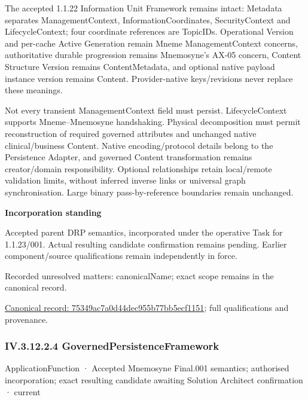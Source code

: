 The accepted 1.1.22 Information Unit Framework remains intact: Metadata separates ManagementContext, InformationCoordinates, SecurityContext and LifecycleContext; four coordinate references are TopicIDs. Operational Version and per-cache Active Generation remain Mneme ManagementContext concerns, authoritative durable progression remains Mnemosyne's AX-05 concern, Content Structure Version remains ContentMetadata, and optional native payload instance version remains Content. Provider-native keys/revisions never replace these meanings.



Not every transient ManagementContext field must persist. LifecycleContext supports Mneme–Mnemosyne handshaking. Physical decomposition must permit reconstruction of required governed attributes and unchanged native clinical/business Content. Native encoding/protocol details belong to the Persistence Adapter, and governed Content transformation remains creator/domain responsibility. Optional relationships retain local/remote validation limits, without inferred inverse links or universal graph synchronisation. Large binary pass-by-reference boundaries remain unchanged.



\par\medskip\textbf{Incorporation standing}\par


Accepted parent DRP semantics, incorporated under the operative Task for 1.1.23/001. Actual resulting candidate confirmation remains pending. Earlier component/source qualifications remain independently in force.


{\small Recorded unresolved matters: canonicalName; exact scope remains in the canonical record.}\par
{\footnotesize \href{../../../../continuum/application/application-function/75349ac7a0d44dec955b77bb5ecf1151.md}{Canonical record: 75349ac7a0d44dec955b77bb5ecf1151}; full qualifications and provenance.}\par
\subsubsection*{IV.3.12.2.4 GovernedPersistenceFramework}
\label{navigation:IV.3.12.2.4}

\label{element:812fa47cef1442aeb34ec34f263616be}
{\small ApplicationFunction · Accepted Mnemosyne Final.001 semantics; authorised incorporation; exact resulting candidate awaiting Solution Architect confirmation · current}\par

